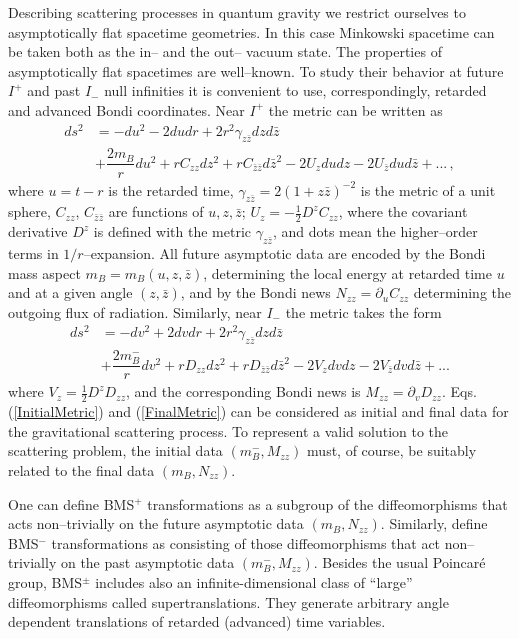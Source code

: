 \documentclass[12pt]{article}
\newcommand{\be}{\begin{equation}}
\newcommand{\ee}{\end{equation}}
\begin{document}
Describing scattering processes in quantum gravity we restrict ourselves to asymptotically flat spacetime geometries.
In this case Minkowski spacetime can be taken both as the in-- and the out-- vacuum state. The properties of asymptotically flat spacetimes are well--known. To study their behavior at future $I^+$ and past $I_-$ null infinities it is convenient to use, correspondingly, retarded and advanced Bondi coordinates. Near $I^+$ the metric can be written as \cite{Wald:1984rg}
\be
\begin{split}\label{FinalMetric}
ds^2 & =-du^2-2dudr+2r^2\gamma_{z\bar{z}}dzd\bar{z}\nonumber \\
        & +\dfrac{2m_B}{r}du^2+rC_{zz}dz^2+rC_{\bar{z}\bar{z}}d\bar{z}^2-2U_zdudz-2U_{\bar{z}}dud\bar{z}+...\,,
\end{split}
\ee
where $u=t-r$ is the retarded time, $\gamma_{z\bar{z}}=2(1+z\bar{z})^{-2}$ is the metric of a unit sphere, $C_{zz}$, $C_{\bar{z}\bar{z}}$ are functions of $u,z,\bar{z}$; $U_z=-\frac{1}{2}D^zC_{zz}$, where the covariant derivative $D^z$ is defined with the metric $\gamma_{z\bar{z}}$, and dots mean the higher--order terms in $1/r$--expansion. All future asymptotic data are encoded by the Bondi mass aspect $m_B=m_B(u,z,\bar{z})$, determining the
local energy at retarded time $u$ and at a given angle $(z,\bar{z})$,
and by the Bondi news $N_{zz}=\partial_uC_{zz}$ determining the outgoing flux of radiation.
Similarly, near $I_-$ the metric takes the form
\be
\begin{split}\label{InitialMetric}
ds^2 & =-dv^2+2dvdr+2r^2\gamma_{z\bar{z}}dzd\bar{z}\nonumber \\
        & +\dfrac{2m_B^-}{r}dv^2+rD_{zz}dz^2+rD_{\bar{z}\bar{z}}d\bar{z}^2-2V_zdvdz-2V_{\bar{z}}dvd\bar{z}+...
\end{split}
\ee
where $V_z=\frac{1}{2}D^zD_{zz}$, and the corresponding Bondi news is $M_{zz}=\partial_vD_{zz}$. Eqs.(\ref{InitialMetric}) and (\ref{FinalMetric}) can be considered as initial and final data for the gravitational scattering process. To represent a valid solution to the scattering problem, the initial data $(m_B^-,M_{zz})$ must, of course, be suitably related to the final data $(m_B,N_{zz})$.

One can define BMS$^+$ transformations as a subgroup of the diffeomorphisms that acts non--trivially on the future asymptotic data $(m_B,N_{zz})$. Similarly, define BMS$^-$ transformations as consisting of those diffeomorphisms that act non--trivially on the past asymptotic data $(m_B^-,M_{zz})$.
Besides the usual Poincar\'e group, BMS$^{\pm}$ includes also an infinite-dimensional class of ``large'' diffeomorphisms called supertranslations. They generate arbitrary angle dependent translations of retarded (advanced) time variables.
\end{document}
